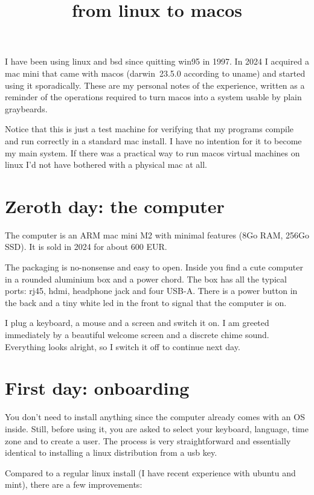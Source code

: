 \title{from linux to macos}

I have been using linux and bsd since quitting win95 in 1997.  In 2024 I
acquired a mac mini that came with macos (darwin~23.5.0 according to
uname) and started using it sporadically.  These are my personal notes of the
experience, written as a reminder of the operations required to turn macos
into a system usable by plain graybeards.

Notice that this is just a test machine for verifying that my programs
compile and run correctly in a standard mac install.  I have no intention for
it to become my main system.  If there was a practical way to run macos
virtual machines on linux I'd not have bothered with a physical mac at all.

\section*{Zeroth day: the computer}

The computer is an ARM mac mini M2 with minimal features (8Go RAM, 256Go
SSD).  It is sold in 2024 for about 600 EUR.

The packaging is no-nonsense and easy to open.  Inside you find a cute
computer in a rounded aluminium box and a power chord.  The box has all the
typical ports: rj45, hdmi, headphone jack and four USB-A.  There is a
power button in the back and a tiny white led in the front to signal that
the computer is on.

I plug a keyboard, a mouse and a screen and switch it on.  I am greeted
immediately by a beautiful welcome screen and a discrete chime sound.
Everything looks alright, so I switch it off to continue next day.

\section*{First day: onboarding}

You don't need to install anything since the computer already comes with an
OS inside.  Still, before using it, you are asked to select your keyboard,
language, time zone and to create a user.  The process is very straightforward
and essentially identical to installing a linux distribution from a usb key.

Compared to a regular linux install (I have recent experience with ubuntu and
mint), there are a few improvements:

